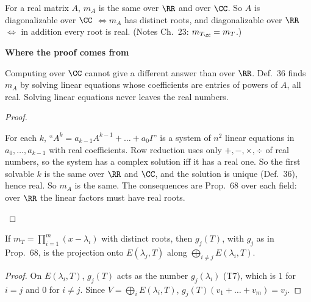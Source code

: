 \documentclass[10pt]{scrartcl}
\newenvironment{motive}{\begin{mdframed}[style=thinkbox]\textbf{\color{OliveGreen!75!black}Where the proof comes from}\begin{description}[leftmargin=0.9em,labelindent=0pt,itemsep=2pt,topsep=2pt,font=\normalfont\bfseries\color{OliveGreen!70!black}]}{\end{description}\end{mdframed}}
\newenvironment{steps}{\begin{enumerate}[label=\arabic*.,leftmargin=1.5em,itemsep=2pt,topsep=2pt]}{\end{enumerate}}
\begin{document}
\begin{proposition*}
  For a real matrix $A$, $m_A$ is the same over $\RR$ and over $\CC$. So $A$ is diagonalizable over $\CC$ $\iff m_A$ has distinct roots, and diagonalizable over $\RR$ $\iff$ in addition every root is real. (Notes Ch.~23: $m_{T_\CC}=m_T$.)
\end{proposition*}
\begin{motive}
  \ii[Want.] Computing over $\CC$ cannot give a different answer than over $\RR$.
   Def.~36 finds $m_A$ by solving linear equations whose coefficients are entries of powers of $A$, all real. Solving linear equations never leaves the real numbers.
\end{motive}
\begin{proof}
  \begin{steps}
    \ii For each $k$, ``$A^k=a_{k-1}A^{k-1}+\dots+a_0I$'' is a system of $n^2$ linear equations in $a_0,\dots,a_{k-1}$ with real coefficients.
    \ii Row reduction uses only $+,-,\times,\div$ of real numbers, so the system has a complex solution iff it has a real one.
    \ii So the first solvable $k$ is the same over $\RR$ and $\CC$, and the solution is unique (Def.~36), hence real. So $m_A$ is the same.
    \ii The consequences are Prop.~68 over each field: over $\RR$ the linear factors must have real roots.
  \end{steps}
\end{proof}

\begin{proposition*}
  If $m_T=\prod_{i=1}^m(x-\lambda_i)$ with distinct roots, then $g_j(T)$, with $g_j$ as in Prop.~68, is the projection onto $E(\lambda_j,T)$ along $\bigoplus_{i\ne j}E(\lambda_i,T)$.
\end{proposition*}
\begin{proof}
  On $E(\lambda_i,T)$, $g_j(T)$ acts as the number $g_j(\lambda_i)$ (T7), which is $1$ for $i=j$ and $0$ for $i\ne j$. Since $V=\bigoplus_iE(\lambda_i,T)$, $g_j(T)(v_1+\dots+v_m)=v_j$.
\end{proof}
\end{document}
